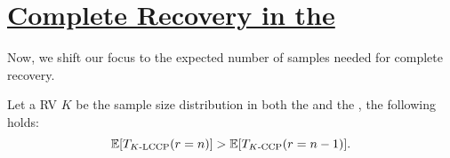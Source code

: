 \section{\texorpdfstring{\hyperref[Problem:complete_recovery]{Complete Recovery in the \efmecd}}{Complete Recovery in the \efmecd}}
\label{sec:complete_recovery}

Now, we shift our focus to the expected number of samples needed for complete recovery.

\begin{theorem}
    Let a RV $K$ be the sample size distribution 
    in both the  and the ,
    the following holds:
    \begin{equation}
    \label{theorem:expected:MECD_vs_CCP}
        \E[\T{\fmecd{K}{P}{n}}{r=n}] > \E[\T{\ccpg{K}{n}}{r=n-1}].
    \end{equation}
\end{theorem}


